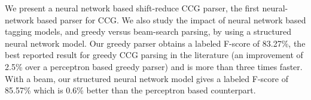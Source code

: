 We present a neural network based shift-reduce CCG parser, the first neural-network based parser for CCG. We also study the impact of neural network based tagging models, and greedy versus beam-search parsing, by using a structured neural network model. Our greedy parser obtains a labeled F-score of 83.27\%, the best reported result for greedy CCG parsing in the literature (an improvement of 2.5\% over a perceptron based greedy parser) and is more than three times faster. With a beam, our structured neural network model gives a labeled F-score of 85.57\% which is 0.6\% better than the perceptron based counterpart.
